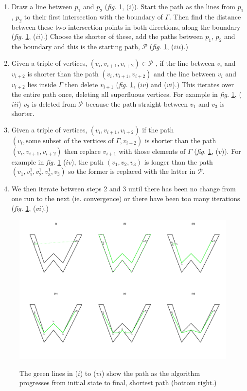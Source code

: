 \documentclass[a4paper,10pt]{article}
\newcommand{\fig}[1]{\emph{fig.} \ref{#1}}
\begin{document}
\begin{enumerate}
\item Draw a line between $p_1$ and $p_2$ (\fig{wdia}, ($i$)). Start the path as the lines from $p_1$, $p_2$ to their first intersection with the boundary of $\Gamma$. Then find the distance between these two intersection points in both directions, along the boundary (\fig{wdia}, ($ii$).) Choose the shorter of these, add the paths between $p_1$, $p_2$ and the boundary and this is the starting path, $\mathcal{P}$ (\fig{wdia}, ($iii$).) 
\item Given a triple of vertices, $(v_i, v_{i+1}, v_{i+2}) \in \mathcal{P}$ , if the line between $v_i$ and $v_{i+2}$ is shorter than the path $(v_i, v_{i+1}, v_{i+2})$ and the line between $v_i$ and $v_{i+2}$ lies inside $\Gamma$ then delete $v_{i+1}$ (\fig{wdia}, ($iv$) and ($vi$).) This iterates over the entire path once, deleting all superfluous vertices. For example in \fig{wdia}, ($iii$) $v_2$ is deleted from $\mathcal{P}$ because the path straight between $v_1$ and $v_3$ is shorter. 
\item Given a triple of vertices, $(v_i, v_{i+1}, v_{i+2})$ if the path $(v_i, \text{some subset of the vertices of } \Gamma, v_{i+2})$ is shorter than the path $(v_i, v_{i+1}, v_{i+2})$ then replace $v_{i+1}$ with those elements of $\Gamma$ (\fig{wdia}, ($v$)). For example in \fig{wdia} ($iv$), the path $(v_1, v_2, v_3)$ is longer than the path $(v_1, v^1_1, v^1_2, v^1_3, v_3)$ so the former is replaced with the latter in $\mathcal{P}$.
\item We then iterate between steps 2 and 3 until there has been no change from one run to the next (ie. convergence) or there have been too many iterations (\fig{wdia}, ($vi$).)
\end{enumerate}

\begin{figure}
\centering
\includegraphics[trim=0in 0.5in 0in 0.25in, width=9.5in]{figs/wdia.pdf} \\
\caption{The green lines in ($i$) to ($vi$) show the path as the algorithm progresses from initial state to final, shortest path (bottom right.) }
\label{wdia}
\end{figure}
\end{document}
